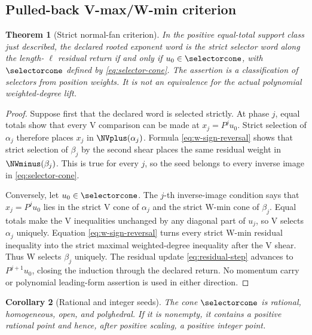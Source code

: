 \documentclass[11pt,letterpaper]{article}
\newtheorem{theorem}{Theorem}[section]
\newtheorem{corollary}[theorem]{Corollary}
\theoremstyle{definition}
\theoremstyle{remark}
\numberwithin{equation}{section}
\begin{document}
\subsection{Pulled-back V-max/W-min criterion}

\begin{theorem}[Strict normal-fan criterion]
\label{thm:selector-fan}
In the positive equal-total support class just described, the declared
rooted exponent word is the strict selector word along the length-
\(\ell\) residual return if and only if \(u_0\in\selectorcone\), with
\(\selectorcone\) defined by \eqref{eq:selector-cone}.  The assertion is a
classification of selectors from position weights.  It is not an
equivalence for the actual polynomial weighted-degree lift.
\end{theorem}

\begin{proof}
Suppose first that the declared word is selected strictly.  At phase \(j\),
equal totals show that every V comparison can be made at
\(x_j=P^ju_0\).  Strict selection of \(\alpha_j\) therefore places
\(x_j\) in \(\NVplus(\alpha_j)\).  Formula
\eqref{eq:w-sign-reversal} shows that strict selection of \(\beta_j\) by the
second shear places the same residual weight in
\(\NWminus(\beta_j)\).  This is true for every \(j\), so the seed belongs
to every inverse image in \eqref{eq:selector-cone}.

Conversely, let \(u_0\in\selectorcone\).  The \(j\)-th inverse-image
condition says that \(x_j=P^ju_0\) lies in the strict V cone of
\(\alpha_j\) and the strict W-min cone of \(\beta_j\).  Equal totals make
the V inequalities unchanged by any diagonal part of \(u_j\), so V selects
\(\alpha_j\) uniquely.  Equation \eqref{eq:w-sign-reversal} turns every
strict W-min residual inequality into the strict maximal weighted-degree
inequality after the V shear.  Thus W selects \(\beta_j\) uniquely.  The
residual update \eqref{eq:residual-step} advances to \(P^{j+1}u_0\), closing
the induction through the declared return.  No momentum carry or polynomial
leading-form assertion is used in either direction.
\end{proof}

\begin{corollary}[Rational and integer seeds]
\label{cor:rational-seed}
The cone \(\selectorcone\) is rational, homogeneous, open, and polyhedral.
If it is nonempty, it contains a positive rational point and hence, after
positive scaling, a positive integer point.
\end{corollary}
\end{document}
